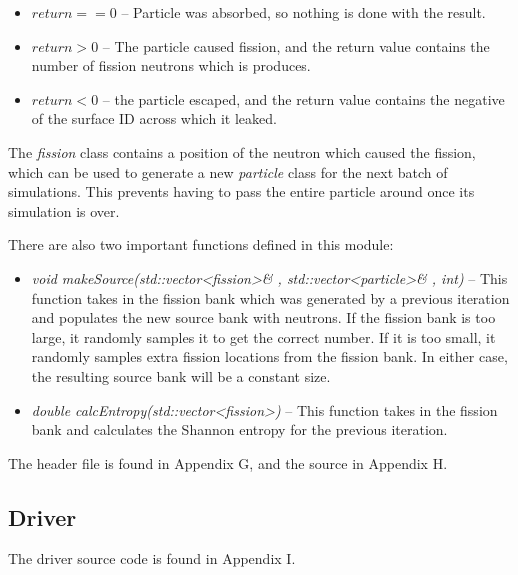 \begin{itemize}
\item $return == 0$ -- Particle was absorbed, so nothing is done with the result.
\item $return > 0$ -- The particle caused fission, and the return value contains the number of fission neutrons which is produces.
\item $return < 0$ -- the particle escaped, and the return value contains the negative of the surface ID across which it leaked.
\end{itemize}

The \textit{fission} class contains a position of the neutron which caused the fission, which can be used to generate a new \textit{particle} class for the next batch of simulations.  This prevents having to pass the entire particle around once its simulation is over.

There are also two important functions defined in this module:

\begin{itemize}
\item \textit{void makeSource(std::vector<fission>\& , std::vector<particle>\& , int)} -- This function takes in the fission bank which was generated by a previous iteration and populates the new source bank with neutrons.  If the fission bank is too large, it randomly samples it to get the correct number.  If it is too small, it randomly samples extra fission locations from the fission bank.  In either case, the resulting source bank will be a constant size.
\item \textit{double calcEntropy(std::vector<fission>)} -- This function takes in the fission bank and calculates the Shannon entropy for the previous iteration.
\end{itemize}

The header file is found in Appendix G, and the source in Appendix H.

\subsection{Driver}\label{ss:driver}

The driver source code is found in Appendix I.

